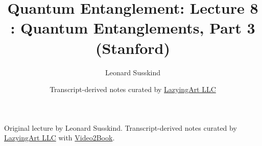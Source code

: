 \documentclass[11pt,oneside]{book}
\begin{document}
\frontmatter
\title{Quantum Entanglement: Lecture 8 : Quantum Entanglements, Part 3 (Stanford)}
\author{Leonard Susskind}
\date{Transcript-derived notes curated by \href{https://lazying.art}{LazyingArt LLC}}
\maketitle
\begin{center}
\small Original lecture by Leonard Susskind. Transcript-derived notes curated by \href{https://lazying.art}{LazyingArt LLC} with \href{https://github.com/lachlanchen/Video2Book}{Video2Book}.
\end{center}
\clearpage
\mainmatter

\end{document}

